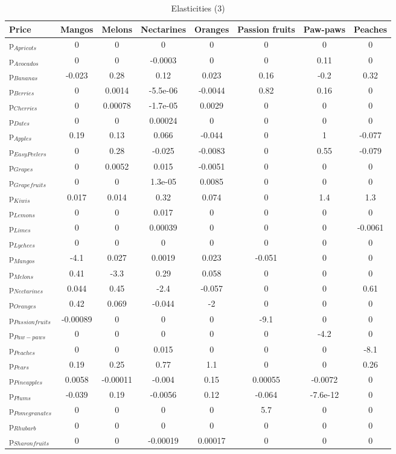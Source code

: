 \documentclass[11pt]{article}
\begin{document}
\begin{table}[h]
\caption{Elasticities (3)}
\label{table:elasticities 3}
\begin{center}
\begin{tabular}{lccccccc} \hline \hline
Price &Mangos &Melons &Nectarines &Oranges &Passion fruits &Paw-paws &Peaches \\ \hline
p$_{Apricots}$ &0 &0 &0 &0 &0 &0 &0 \\
p$_{Avocados}$ &0 &0 &-0.0003 &0 &0 &0.11 &0 \\
p$_{Bananas}$ &-0.023 &0.28 &0.12 &0.023 &0.16 &-0.2 &0.32 \\
p$_{Berries}$ &0 &0.0014 &-5.5e-06 &-0.0044 &0.82 &0.16 &0 \\
p$_{Cherries}$ &0 &0.00078 &-1.7e-05 &0.0029 &0 &0 &0 \\
p$_{Dates}$ &0 &0 &0.00024 &0 &0 &0 &0 \\
p$_{Apples}$ &0.19 &0.13 &0.066 &-0.044 &0 &1 &-0.077 \\
p$_{Easy Peelers}$ &0 &0.28 &-0.025 &-0.0083 &0 &0.55 &-0.079 \\
p$_{Grapes}$ &0 &0.0052 &0.015 &-0.0051 &0 &0 &0 \\
p$_{Grapefruits}$ &0 &0 &1.3e-05 &0.0085 &0 &0 &0 \\
p$_{Kiwis}$ &0.017 &0.014 &0.32 &0.074 &0 &1.4 &1.3 \\
p$_{Lemons}$ &0 &0 &0.017 &0 &0 &0 &0 \\
p$_{Limes}$ &0 &0 &0.00039 &0 &0 &0 &-0.0061 \\
p$_{Lychees}$ &0 &0 &0 &0 &0 &0 &0 \\
p$_{Mangos}$ &-4.1 &0.027 &0.0019 &0.023 &-0.051 &0 &0 \\
p$_{Melons}$ &0.41 &-3.3 &0.29 &0.058 &0 &0 &0 \\
p$_{Nectarines}$ &0.044 &0.45 &-2.4 &-0.057 &0 &0 &0.61 \\
p$_{Oranges}$ &0.42 &0.069 &-0.044 &-2 &0 &0 &0 \\
p$_{Passion fruits}$ &-0.00089 &0 &0 &0 &-9.1 &0 &0 \\
p$_{Paw-paws}$ &0 &0 &0 &0 &0 &-4.2 &0 \\
p$_{Peaches}$ &0 &0 &0.015 &0 &0 &0 &-8.1 \\
p$_{Pears}$ &0.19 &0.25 &0.77 &1.1 &0 &0 &0.26 \\
p$_{Pineapples}$ &0.0058 &-0.00011 &-0.004 &0.15 &0.00055 &-0.0072 &0 \\
p$_{Plums}$ &-0.039 &0.19 &-0.0056 &0.12 &-0.064 &-7.6e-12 &0 \\
p$_{Pomegranates}$ &0 &0 &0 &0 &5.7 &0 &0 \\
p$_{Rhubarb}$ &0 &0 &0 &0 &0 &0 &0 \\
p$_{Sharon fruits}$ &0 &0 &-0.00019 &0.00017 &0 &0 &0 \\
\end{tabular}
\end{center}
\end{table}
\end{document}
